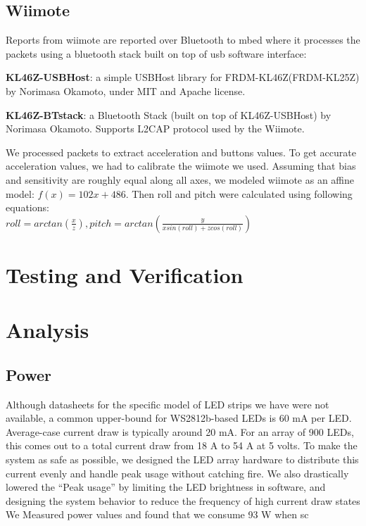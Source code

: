 \documentclass{tufte-handout}
\begin{document}
\subsection{Wiimote}
Reports from wiimote are reported over Bluetooth to mbed where it processes the packets using a bluetooth stack built on top of usb software interface:
\begin{enumerate*}
    \item
        \textbf{KL46Z-USBHost}:
a simple USBHost library for FRDM-KL46Z(FRDM-KL25Z) by Norimasa Okamoto, under MIT and Apache license.
\item
    \textbf{KL46Z-BTstack}:
a Bluetooth Stack (built on top of KL46Z-USBHost) by Norimasa Okamoto. Supports L2CAP protocol used by the Wiimote.
\end{enumerate*}
We processed packets to extract acceleration and buttons values. To get accurate acceleration values, we had to calibrate the wiimote we used. Assuming that bias and sensitivity are roughly equal along all axes, we modeled wiimote as an affine model: $f(x) = 102x + 486 $. Then roll and pitch were calculated using following equations:\\
$ roll = arctan(\frac{x}{z}) , pitch = arctan(\frac{y}{x sin(roll) + z cos(roll)})$
\section{\textbf{Testing and Verification}} 
\section{\textbf{Analysis}}
\subsection{Power}
Although datasheets for the specific model of LED strips we have were not
available, a common upper-bound for WS2812b-based 
LEDs is 60 mA per LED. Average-case current draw is typically around
    20 mA. For an array of 900 LEDs, this comes out to a total current draw
    from 18 A to 54 A at 5 volts. To make the system as safe as possible, we designed the
    LED array hardware to distribute this current evenly and
    handle peak usage without catching fire. We also drastically lowered the ``Peak usage'' by limiting the LED brightness in software, and designing the
    system behavior to reduce the frequency of high current draw
    states
    We Measured power values and found that we consume 93 W when sc 
\end{document}
